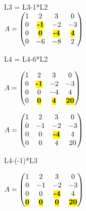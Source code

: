 \vspace{5mm} %

L3 = L3-1*L2 \\

$
A =
\begin{pmatrix}
  1 & 2 & 3 & 0    \\
  0 & \hl{\textbf{-1}} & -2 & -3 \\
  0 & \hl{\textbf{0}} & \hl{\textbf{-4}} & \hl{\textbf{4}}   \\
  0 & -6 & -8 & 2  \\
\end{pmatrix}
$

\vspace{5mm} %

L4 = L4-6*L2 \\

\vspace{5mm} %

$
A =
\begin{pmatrix}
  1 & 2 & 3 & 0    \\
  0 & \hl{\textbf{-1}} & -2 & -3 \\
  0 & 0 & -4 & 4   \\
  0 & \hl{\textbf{0}} & \hl{\textbf{4}} & \hl{\textbf{20}}   \\
\end{pmatrix}
$

\vspace{5mm} %

$
A =
\begin{pmatrix}
  1 & 2 & 3 & 0    \\
  0 & -1 & -2 & -3 \\
  0 & 0 & \hl{\textbf{-4}} & 4   \\
  0 & 0 & 4 & 20  \\
\end{pmatrix}
$

\vspace{5mm} %

L4-(-1)*L3\\

\vspace{5mm} %

$
A =
\begin{pmatrix}
  1 & 2 & 3 & 0    \\
  0 & -1 & -2 & -3 \\
  0 & 0 & \hl{\textbf{-4}} & 4   \\
  \hl{\textbf{0}} & \hl{\textbf{0}} & \hl{\textbf{0}} & \hl{\textbf{20}}  \\
\end{pmatrix}
$

